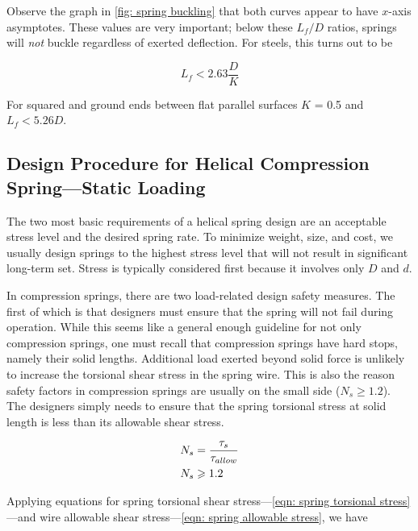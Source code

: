 \documentclass[
10pt,
a4paper,
openany,
svgnames,
]{book}
\begin{document}
Observe the graph in \cref{fig: spring buckling} that both curves appear to have $x$-axis asymptotes. These values are very important; below these $L_f/D$ ratios, springs will \emph{not} buckle regardless of exerted deflection. For steels, this turns out to be

\begin{equation}
  L_f < 2.63 \frac{D}{K}
\end{equation}

For squared and ground ends between flat parallel surfaces $K$ = 0.5 and $L_f < 5.26 D$.

\subsection{Design Procedure for Helical Compression Spring—Static Loading}

The two most basic requirements of a helical spring design are an acceptable stress level and the desired spring rate. To minimize weight, size, and cost, we usually design springs to the highest stress level that will not result in significant long-term set. Stress is typically considered first because it involves only $D$ and $d$.

In compression springs, there are two load-related design safety measures. The first of which is that designers must ensure that the spring will not fail during operation. While this seems like a general enough guideline for not only compression springs, one must recall that compression springs have hard stops, namely their solid lengths. Additional load exerted beyond solid force is unlikely to increase the torsional shear stress in the spring wire. This is also the reason safety factors in compression springs are usually on the small side ($N_s \geq 1.2$). The designers simply needs to ensure that the spring torsional stress at solid length is less than its allowable shear stress.

\begin{equation} \label{eqn: spring allowable stress}
  \begin{gathered}
    N_s = \frac{\tau _s}{\tau _{allow}} \hfill \\
    N_s \geqslant 1.2 \hfill \\ 
  \end{gathered}
\end{equation}

Applying equations for spring torsional shear stress—\cref{eqn: spring torsional stress}—and wire allowable shear stress—\cref{eqn: spring allowable stress}, we have
\end{document}
